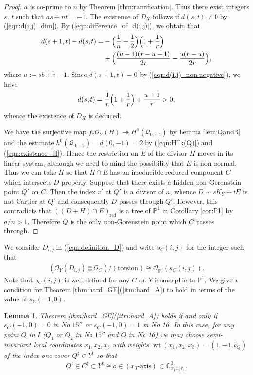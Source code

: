 \documentclass[a4paper,11pt]{amsart}
\newtheorem{lemma}[theorem]{Lemma}
\theoremstyle{definition}
\theoremstyle{remark}
\numberwithin{equation}{section}
\newcommand{\bC}{{\mathbb C}}
\newcommand{\bP}{{\mathbb P}}
\newcommand{\cO}{{\mathcal O}}
\newcommand{\cQ}{{\mathcal Q}}
\newcommand{\axis}{\textrm{-}\mathrm{axis}}
\newcommand{\red}{\mathrm{red}}
\newcommand{\torsion}{\mathrm{torsion}}
\newcommand{\wt}{\operatorname{wt}}
\begin{document}
\begin{proof}
$a$ is co-prime to $n$ by Theorem \ref{thm:ramification}.
Thus there exist integers $s$, $t$ such that $as+nt=-1$.
The existence of $D_X$ follows if $d(s,t)\neq 0$ by (\ref{eqn:d(i,j)=dim}).
By (\ref{eqn:difference_of_d(i,j)}),
we obtain that
\begin{align*}
d(s+1,t)-d(s,t)=
&-\Bigl(\frac{1}{n}+\frac{1}{2}\Bigr)\Bigl(1+\frac{1}{r}\Bigr) \\
&+\Bigl(\frac{(u+1)(r-u-1)}{2r}-\frac{u(r-u)}{2r}\Bigr),
\end{align*}
where $u:=\overline{sb+t-1}$.
Since $d(s+1,t)=0$ by (\ref{eqn:d(i,j)_non-negative}),
we have
\begin{align*}
d(s,t)=\frac{1}{n}\Bigl(1+\frac{1}{r}\Bigr)+\frac{u+1}{r}>0,
\end{align*}
whence the existence of $D_X$ is deduced.

We have the surjective map
$f_*\cO_Y(H) \twoheadrightarrow H^0(\cQ_{0,-1})$ by Lemma \ref{lem:QandR}
and the estimate $h^0(\cQ_{0,-1})=d(0,-1)=2$ by
(\ref{eqn:H^k(Q)}) and (\ref{eqn:existence_H}).
Hence the restriction on $E$ of the divisor $H$ moves in its linear system,
although we need to mind the possibility that $E$ is non-normal.
Thus we can take $H$ so that
$H \cap E$ has an irreducible reduced component $C$
which intersects $D$ properly.
Suppose that there exists a hidden non-Gorenstein point $Q'$ on $C$.
Then the index $r'$ at $Q'$ is a divisor of $n$,
whence $D \sim sK_Y+tE$ is not Cartier at $Q'$ and
consequently $D$ passes through $Q'$.
However,
this contradicts that $((D+H) \cap E)_\red$ is a tree of $\bP^1$
in Corollary \ref{cor:P1} by $a/n>1$.
Therefore $Q$ is the only non-Gorenstein point which $C$ passes through.
\end{proof}

We consider $D_{i,j}$ in (\ref{eqn:definition_D})
and write $s_C(i,j)$ for the integer such that
\begin{align*}
(\cO_Y(D_{i,j}) \otimes \cO_C)/(\torsion) \cong \cO_{\bP^1}(s_C(i,j)).
\end{align*}
Note that $s_C(i,j)$ is well-defined for any $C$ on $Y$ isomorphic to $\bP^1$.
We give a condition for Theorem \textup{\ref{thm:hard_GE}}(\ref{itm:hard_A})
to hold in terms of the value of $s_C(-1,0)$.

\begin{lemma}\label{lem:numerical_condition}
Theorem \textup{\ref{thm:hard_GE}(\ref{itm:hard_A})} holds
if and only if $s_C(-1,0)=0$ in No $\textrm{15}''$ or $s_C(-1,0)=1$ in No 16.
In this case,
for any point $Q$ in $I$
\textup{(}$Q_1$ or $Q_2$ in No $\textrm{15}''$
and $Q$ in No 16\textup{)}
we may choose semi-invariant local coordinates
$x_1,x_2,x_3$ with weights $\wt(x_1, x_2, x_3)=(1, -1, b_Q)$
of the index-one cover $Q^\sharp \in Y^\sharp$ so that
\begin{align*}
Q^\sharp \in C^\sharp \subset Y^\sharp
\cong o \in (x_3\axis) \subset \bC^3_{x_1x_2x_3}.
\end{align*}
\end{lemma}
\end{document}
